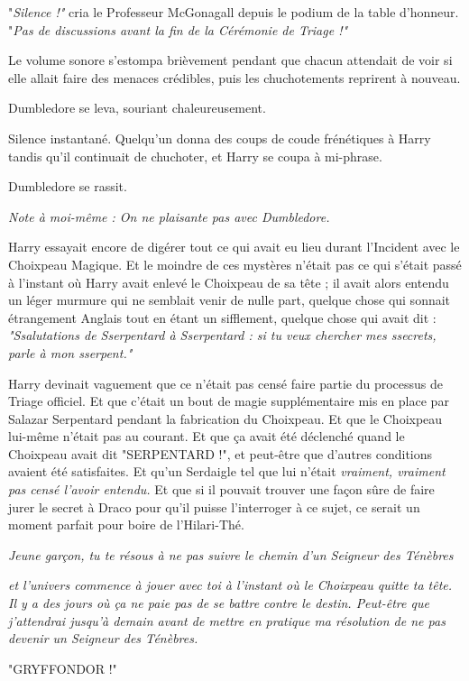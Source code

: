 "\emph{Silence !"}  cria le Professeur McGonagall depuis le podium de la table d'honneur. "\emph{Pas de discussions avant la fin de la Cérémonie de Triage !"} 

Le volume sonore s'estompa brièvement pendant que chacun attendait de voir si elle allait faire des menaces crédibles, puis les chuchotements reprirent à nouveau.

Dumbledore se leva, souriant chaleureusement.

Silence instantané. Quelqu'un donna des coups de coude frénétiques à Harry tandis qu'il continuait de chuchoter, et Harry se coupa à mi-phrase.

Dumbledore se rassit.

\emph{Note à moi-même : On ne plaisante pas avec Dumbledore.} 

Harry essayait encore de digérer tout ce qui avait eu lieu durant l'Incident avec le Choixpeau Magique. Et le moindre de ces mystères n'était pas ce qui s'était passé à l'instant où Harry avait enlevé le Choixpeau de sa tête ; il avait alors entendu un léger murmure qui ne semblait venir de nulle part, quelque chose qui sonnait étrangement Anglais tout en étant un sifflement, quelque chose qui avait dit : \emph{"Ssalutations de Sserpentard à Sserpentard : si tu veux chercher mes ssecrets, parle à mon sserpent."} 

Harry devinait vaguement que ce n'était pas censé faire partie du processus de Triage officiel. Et que c'était un bout de magie supplémentaire mis en place par Salazar Serpentard pendant la fabrication du Choixpeau. Et que le Choixpeau lui-même n'était pas au courant. Et que ça avait été déclenché quand le Choixpeau avait dit "SERPENTARD !", et peut-être que d'autres conditions avaient été satisfaites. Et qu'un Serdaigle tel que lui n'était \emph{vraiment, vraiment pas censé l'avoir entendu.}  Et que si il pouvait trouver une façon sûre de faire jurer le secret à Draco pour qu'il puisse l'interroger à ce sujet, ce serait un moment parfait pour boire de l'Hilari-Thé.

\emph{Jeune garçon, tu te résous à ne pas suivre le chemin d'un Seigneur des Ténèbres} 

\emph{et l'univers commence à jouer avec toi à l'instant où le Choixpeau quitte ta tête. Il y a des jours où ça ne paie pas de se battre contre le destin. Peut-être que j'attendrai jusqu'à demain avant de mettre en pratique ma résolution de ne pas devenir un Seigneur des Ténèbres.} 

"GRYFFONDOR !"

